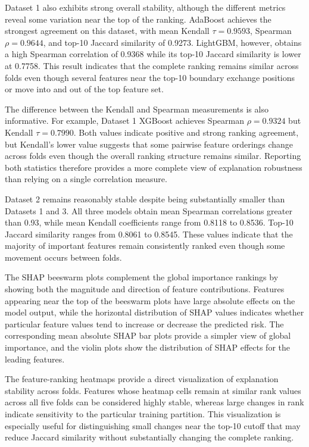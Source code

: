Dataset 1 also exhibits strong overall stability, although the different
metrics reveal some variation near the top of the ranking. AdaBoost achieves
the strongest agreement on this dataset, with mean Kendall $\tau=0.9593$,
Spearman $\rho=0.9644$, and top-10 Jaccard similarity of 0.9273. LightGBM,
however, obtains a high Spearman correlation of 0.9368 while its top-10 Jaccard
similarity is lower at 0.7758. This result indicates that the complete ranking
remains similar across folds even though several features near the top-10
boundary exchange positions or move into and out of the top feature set.

The difference between the Kendall and Spearman measurements is also
informative. For example, Dataset 1 XGBoost achieves Spearman
$\rho=0.9324$ but Kendall $\tau=0.7990$. Both values indicate positive and
strong ranking agreement, but Kendall's lower value suggests that some
pairwise feature orderings change across folds even though the overall ranking
structure remains similar. Reporting both statistics therefore provides a more
complete view of explanation robustness than relying on a single correlation
measure.

Dataset 2 remains reasonably stable despite being substantially smaller than
Datasets 1 and 3. All three models obtain mean Spearman correlations greater
than 0.93, while mean Kendall coefficients range from 0.8118 to 0.8536.
Top-10 Jaccard similarity ranges from 0.8061 to 0.8545. These values indicate
that the majority of important features remain consistently ranked even though
some movement occurs between folds.

The SHAP beeswarm plots complement the global importance rankings by showing
both the magnitude and direction of feature contributions. Features appearing
near the top of the beeswarm plots have large absolute effects on the model
output, while the horizontal distribution of SHAP values indicates whether
particular feature values tend to increase or decrease the predicted risk.
The corresponding mean absolute SHAP bar plots provide a simpler view of
global importance, and the violin plots show the distribution of SHAP effects
for the leading features.

The feature-ranking heatmaps provide a direct visualization of explanation
stability across folds. Features whose heatmap cells remain at similar rank
values across all five folds can be considered highly stable, whereas large
changes in rank indicate sensitivity to the particular training partition.
This visualization is especially useful for distinguishing small changes near
the top-10 cutoff that may reduce Jaccard similarity without substantially
changing the complete ranking.

